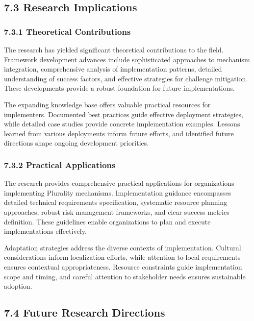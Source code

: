 \hypertarget{research-implications}{%
\subsection{7.3 Research Implications}\label{research-implications}}

\hypertarget{theoretical-contributions}{%
\subsubsection{7.3.1 Theoretical Contributions}\label{theoretical-contributions}}

The research has yielded significant theoretical contributions to the field. Framework development advances include sophisticated approaches to mechanism integration, comprehensive analysis of implementation patterns, detailed understanding of success factors, and effective strategies for challenge mitigation. These developments provide a robust foundation for future implementations.

The expanding knowledge base offers valuable practical resources for implementers. Documented best practices guide effective deployment strategies, while detailed case studies provide concrete implementation examples. Lessons learned from various deployments inform future efforts, and identified future directions shape ongoing development priorities.

\hypertarget{practical-applications}{%
\subsubsection{7.3.2 Practical Applications}\label{practical-applications}}

The research provides comprehensive practical applications for organizations implementing Plurality mechanisms. Implementation guidance encompasses detailed technical requirements specification, systematic resource planning approaches, robust risk management frameworks, and clear success metrics definition. These guidelines enable organizations to plan and execute implementations effectively.

Adaptation strategies address the diverse contexts of implementation. Cultural considerations inform localization efforts, while attention to local requirements ensures contextual appropriateness. Resource constraints guide implementation scope and timing, and careful attention to stakeholder needs ensures sustainable adoption.

\hypertarget{future-research-directions}{%
\subsection{7.4 Future Research Directions}\label{future-research-directions}}


